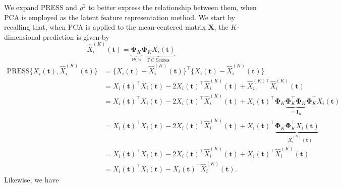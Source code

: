 We expand PRESS and $\rho^2$ to better express the relationship between them, when PCA is employed as the latent feature representation method. 
We start by recalling that, when PCA is applied to the mean-centered matrix $\mathbf{X}$, the $K$-dimensional prediction is given by 
$$
 \widehat{X}^{(K)}_{i} (\mathbf{t}) = \underbrace{\boldsymbol{\Phi}_K}_{\text{PCs}} \underbrace{\boldsymbol{\Phi}_K^\top X_i(\mathbf{t})}_{\text{PC Scores}}
$$
\begin{align*}
    \text{PRESS}\bigg\{X_{i}(\mathbf{t}),  \widehat{X}^{(K)}_{i} (\mathbf{t})\bigg\} &= \bigg\{X_{i}(\mathbf{t}) -  \widehat{X}^{(K)}_{i} (\mathbf{t})\bigg\}^\top \bigg\{X_{i}(\mathbf{t}) -  \widehat{X}^{(K)}_{i} (\mathbf{t})\bigg\} \\
    &= 
    X_{i}(\mathbf{t})^\top X_{i}(\mathbf{t}) - 2 X_{i}(\mathbf{t})^\top  \widehat{X}^{(K)}_{i} (\mathbf{t}) + \widehat{X}^{(K)\top}_{i\cdot}  \widehat{X}^{(K)}_{i} (\mathbf{t}) \\
    &= X_{i}(\mathbf{t})^\top X_{i}(\mathbf{t}) - 2 X_{i}(\mathbf{t})^\top  \widehat{X}^{(K)}_{i} (\mathbf{t}) + X_{i}(\mathbf{t})^\top \boldsymbol{\Phi}_K \underbrace{\boldsymbol{\Phi}_K^\top \boldsymbol{\Phi}_K}_{= \mathbf{I}_K} \boldsymbol{\Phi}_K^\top X_{i}(\mathbf{t}) \\
    &=  X_{i}(\mathbf{t})^\top X_{i}(\mathbf{t}) - 2 X_{i}(\mathbf{t})^\top  \widehat{X}^{(K)}_{i} (\mathbf{t}) + X_{i}(\mathbf{t})^\top \underbrace{\boldsymbol{\Phi}_K \boldsymbol{\Phi}_K^\top X_{i}(\mathbf{t})}_{= \widehat{X}^{(K)}_{i} (\mathbf{t})} \\
    &= X_{i}(\mathbf{t})^\top X_{i}(\mathbf{t}) - 2 X_{i}(\mathbf{t})^\top  \widehat{X}^{(K)}_{i} (\mathbf{t}) + X_{i}(\mathbf{t})^\top  \widehat{X}^{(K)}_{i} (\mathbf{t}) \\
    &= X_{i}(\mathbf{t})^\top X_{i}(\mathbf{t}) - X_{i}(\mathbf{t})^\top  \widehat{X}^{(K)}_{i} (\mathbf{t}).
\end{align*}
Likewise, we have 
